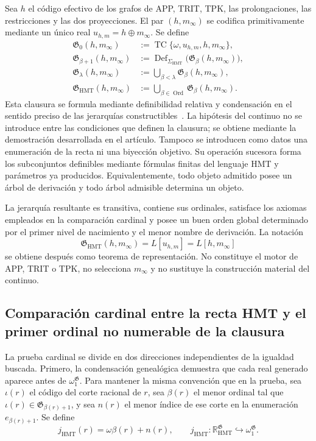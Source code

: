 Sea \(h\) el código efectivo de los grafos de APP, TRIT, TPK, las
prolongaciones, las restricciones y las dos proyecciones. El par
\((h,m_\infty)\) se codifica primitivamente mediante un único real
\(u_{h,m}=h\oplus m_\infty\). Se define
\[
 \begin{aligned}
 \mathfrak G_0(h,m_\infty)
   &:=\operatorname{TC}\{\omega,u_{h,m},h,m_\infty\},\\
 \mathfrak G_{\beta+1}(h,m_\infty)
   &:=\operatorname{Def}_{\Sigma_{\mathrm{HMT}}}
        \bigl(\mathfrak G_\beta(h,m_\infty)\bigr),\\
 \mathfrak G_\lambda(h,m_\infty)
   &:=\bigcup_{\beta<\lambda}\mathfrak G_\beta(h,m_\infty),\\
 \mathfrak G_{\mathrm{HMT}}(h,m_\infty)
   &:=\bigcup_{\beta\in\operatorname{Ord}}
        \mathfrak G_\beta(h,m_\infty).
 \end{aligned}
\]
Esta clausura se formula mediante definibilidad relativa y condensación en el
sentido preciso de las jerarquías constructibles~\cite{Jech2003}. La hipótesis
del continuo no se introduce entre las condiciones que definen la clausura; se
obtiene mediante la demostración desarrollada en el artículo. Tampoco se
introducen como datos una enumeración de la recta ni una biyección objetivo. Su
operación sucesora forma los subconjuntos definibles mediante fórmulas finitas
del lenguaje HMT y parámetros ya producidos.
Equivalentemente, todo objeto admitido posee un árbol de derivación y todo
árbol admisible determina un objeto.

La jerarquía resultante es transitiva, contiene sus ordinales, satisface los
axiomas empleados en la comparación cardinal y posee un buen orden global
determinado por el primer nivel de nacimiento y el menor nombre de derivación.
La notación
\[
 \mathfrak G_{\mathrm{HMT}}(h,m_\infty)
 =L[u_{h,m}]=L[h,m_\infty]
\]
se obtiene después como teorema de representación. No constituye el motor de
APP, TRIT o TPK, no selecciona \(m_\infty\) y no sustituye la construcción
material del continuo.

\subsection{Comparación cardinal entre la recta HMT y el primer ordinal no numerable de la clausura}

La prueba cardinal se divide en dos direcciones independientes de la igualdad
buscada. Primero, la condensación genealógica demuestra que cada real generado
aparece antes de \(\omega_1^{\mathfrak G}\). Para mantener la misma
convención que en la prueba, sea \(\iota(r)\) el código del corte racional
de \(r\), sea \(\beta(r)\) el menor ordinal tal que
\(\iota(r)\in\mathfrak G_{\beta(r)+1}\), y sea \(n(r)\) el menor índice
de ese corte en la enumeración \(e_{\beta(r)+1}\). Se define
\[
 j_{\mathrm{HMT}}(r)=\omega\beta(r)+n(r),
 \qquad
 j_{\mathrm{HMT}}:
 \mathbb R_{\mathrm{HMT}}^{\mathfrak G}
 \hookrightarrow\omega_1^{\mathfrak G}.
\]

